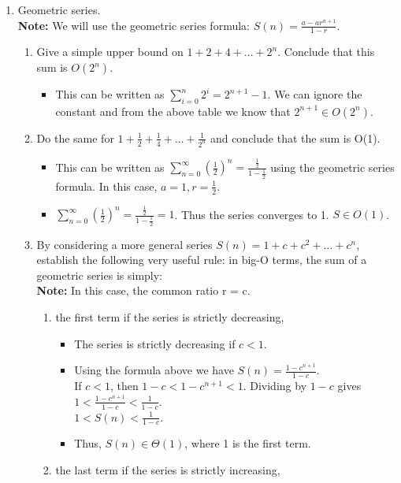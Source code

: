 \documentclass[12pt]{article}
\begin{document}
\begin{enumerate}
\newpage
\item Geometric series. \\
\textbf{Note: } We will use the geometric series formula: $S(n) = \frac{a-ar^{n+1}}{1-r}.$
\begin{enumerate}
	\item Give a simple upper bound on $1+2+4+ \dots +2^n$. Conclude that this sum is $O(2^n)$. 
		\begin{itemize}
			\item This can be written as $\sum_{i = 0}^{n} 2^i = 2^{n+1}-1.$ We can ignore the constant and from the above table we know that $2^{n+1} \in O(2^n).$
		\end{itemize}
	\item Do the same for $1+ \frac{1}{2 }+ \frac{1}{4} + \dots + \frac{1}{2^n} $ and conclude that the sum is O(1).
		\begin{itemize}
			\item This can be written as $\sum_{n = 0}^{\infty} (\frac{1}{2})^n = \frac{\frac{1}{2}}{1 - \frac{1}{2}}$ using the geometric series formula. In this case, $a = 1, r = \frac{1}{2}.$
			\item $\sum_{n = 0}^{\infty} (\frac{1}{2})^n = \frac{\frac{1}{2}}{1 - \frac{1}{2}} = 1$. Thus the series converges to 1. $S \in O(1)$.
		\end{itemize}
	\item By considering a more general series $S(n) = 1 + c + c^2 +  \dots + c^n$, establish the following very useful rule: in big-O terms, the sum of a geometric series is simply: \\
	\textbf{Note: } In this case, the common ratio r = c.
\begin{enumerate}
\item the first term if the series is strictly decreasing, 
	\begin{itemize}
		\item The series is strictly decreasing if $c < 1$.
		\item Using the formula above we have $S(n) = \frac{1-c^{n+1}}{1-c}$.\\
		If $c < 1$, then $1-c < 1-c^{n+1} < 1$. Dividing by $1-c$ gives
		$1 < \frac{1-c^{n+1}}{1-c} < \frac{1}{1-c}$. \\
		$1 < S(n) < \frac{1}{1-c}$.
		\item Thus, $S(n) \in \Theta(1)$, where 1 is the first term.
	\end{itemize}
\item  the last term if the series is strictly increasing, 

\end{enumerate}
\end{enumerate}
\end{enumerate}
\end{document}
